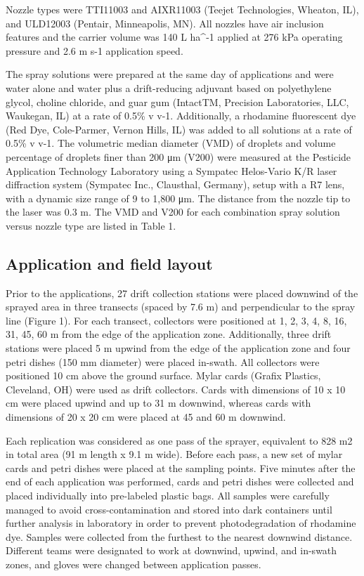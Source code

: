 \documentclass[
  12pt,
  a4paper,
]{article}
\begin{document}
Nozzle types were TTI11003 and AIXR11003 (Teejet Technologies, Wheaton,
IL), and ULD12003 (Pentair, Minneapolis, MN). All nozzles have air
inclusion features and the carrier volume was 140 L ha\^{}-1 applied at
276 kPa operating pressure and 2.6 m s-1 application speed.

The spray solutions were prepared at the same day of applications and
were water alone and water plus a drift-reducing adjuvant based on
polyethylene glycol, choline chloride, and guar gum (IntactTM, Precision
Laboratories, LLC, Waukegan, IL) at a rate of 0.5\% v v-1. Additionally,
a rhodamine fluorescent dye (Red Dye, Cole-Parmer, Vernon Hills, IL) was
added to all solutions at a rate of 0.5\% v v-1. The volumetric median
diameter (VMD) of droplets and volume percentage of droplets finer than
200 μm (V200) were measured at the Pesticide Application Technology
Laboratory using a Sympatec Helos-Vario K/R laser diffraction system
(Sympatec Inc., Clausthal, Germany), setup with a R7 lens, with a
dynamic size range of 9 to 1,800 μm. The distance from the nozzle tip to
the laser was 0.3 m. The VMD and V200 for each combination spray
solution versus nozzle type are listed in Table 1.

\hypertarget{application-and-field-layout}{%
\subsection{Application and field
layout}\label{application-and-field-layout}}

Prior to the applications, 27 drift collection stations were placed
downwind of the sprayed area in three transects (spaced by 7.6 m) and
perpendicular to the spray line (Figure 1). For each transect,
collectors were positioned at 1, 2, 3, 4, 8, 16, 31, 45, 60 m from the
edge of the application zone. Additionally, three drift stations were
placed 5 m upwind from the edge of the application zone and four petri
dishes (150 mm diameter) were placed in-swath. All collectors were
positioned 10 cm above the ground surface. Mylar cards (Grafix Plastics,
Cleveland, OH) were used as drift collectors. Cards with dimensions of
10 x 10 cm were placed upwind and up to 31 m downwind, whereas cards
with dimensions of 20 x 20 cm were placed at 45 and 60 m downwind.

Each replication was considered as one pass of the sprayer, equivalent
to 828 m2 in total area (91 m length x 9.1 m wide). Before each pass, a
new set of mylar cards and petri dishes were placed at the sampling
points. Five minutes after the end of each application was performed,
cards and petri dishes were collected and placed individually into
pre-labeled plastic bags. All samples were carefully managed to avoid
cross-contamination and stored into dark containers until further
analysis in laboratory in order to prevent photodegradation of rhodamine
dye. Samples were collected from the furthest to the nearest downwind
distance. Different teams were designated to work at downwind, upwind,
and in-swath zones, and gloves were changed between application passes.
\end{document}
